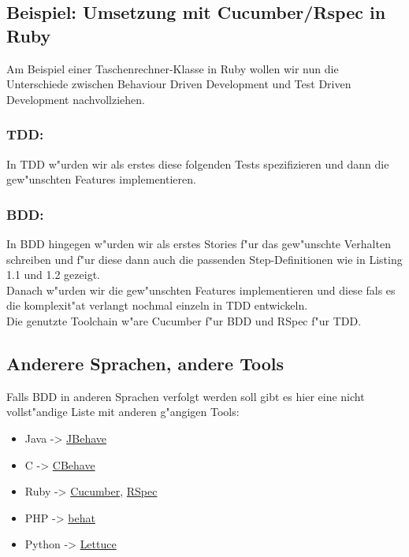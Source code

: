   \subsection{Beispiel: Umsetzung mit Cucumber/Rspec in Ruby}
    Am Beispiel einer Taschenrechner-Klasse in Ruby wollen wir nun die 
    Unterschiede zwischen Behaviour Driven Development und Test Driven 
    Development nachvollziehen.
    \subsubsection{TDD:}
      In TDD w"urden wir als erstes diese folgenden Tests spezifizieren 
      und dann die gew"unschten Features implementieren.
      

    \subsubsection{BDD:}
      In BDD hingegen w"urden wir als erstes Stories f"ur das gew"unschte
      Verhalten schreiben und f"ur diese dann auch die passenden Step-Definitionen
      wie in Listing 1.1 und 1.2 gezeigt.\\
      Danach w"urden wir die gew"unschten Features implementieren und diese
      fals es die komplexit"at verlangt nochmal einzeln in TDD entwickeln.\\
      Die genutzte Toolchain w"are Cucumber f"ur BDD und RSpec f"ur TDD.

  \subsection{Anderere Sprachen, andere Tools}
    Falls BDD in anderen Sprachen verfolgt werden soll gibt es hier eine nicht
    vollst"andige Liste mit anderen g"angigen Tools:
    \begin{itemize}
      \item Java -> \href{http://http://jbehave.org/}{JBehave}
      \item C -> \href{http://code.google.com/p/cbehave/}{CBehave}
      \item Ruby -> \href{http://cukes.info}{Cucumber}, \href{http://rspec.info}{RSpec}
      \item PHP -> \href{http://behat.org}{behat}
      \item Python -> \href{http://lettuce.it}{Lettuce}
    \end{itemize}